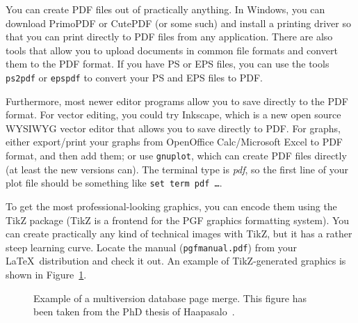 \documentclass[12pt,a4paper,oneside,pdftex]{report}
\begin{document}
You can create PDF files out of practically anything.
In Windows, you can download PrimoPDF or CutePDF (or some such) and install a
printing driver so that you can print directly to PDF files from any
application. There are also tools that allow you to upload documents in common
file formats and convert them to the PDF format.
If you have PS or EPS files, you can use the tools \texttt{ps2pdf} or
\texttt{epspdf} to convert your PS and EPS files to PDF\@.



Furthermore, most newer editor programs allow you to save directly to the PDF
format. For vector editing, you could try Inkscape, which is a new open source
WYSIWYG vector editor that allows you to save directly to PDF\@.
For graphs, either export/print your graphs from OpenOffice Calc/Microsoft
Excel to PDF format, and then add them; or use \texttt{gnuplot}, which can
create PDF files directly (at least the new versions can).
The terminal type is \emph{pdf}, so the first line of your plot file should be
something like \texttt{set term pdf \ldots}.

To get the most professional-looking graphics, you can encode them using the
TikZ package (TikZ is a frontend for the PGF graphics formatting system).
You can create practically any kind of technical images with TikZ, but it has a
rather steep learning curve. Locate the manual (\texttt{pgfmanual.pdf}) from
your \LaTeX\ distribution and check it out. An example of TikZ-generated
graphics is shown in Figure~\ref{fig:page-merge}.

\begin{figure}[ht]
  \begin{center}
    
    \caption{Example of a multiversion database page merge. This figure has
    been taken from the PhD thesis of Haapasalo~\cite{HaapasaloThesis}.}
    \label{fig:page-merge}
  \end{center}
\end{figure}
\end{document}
